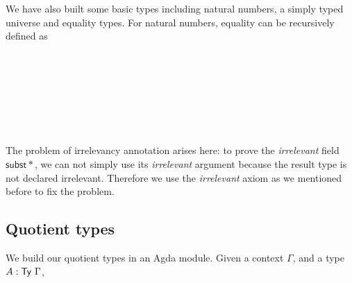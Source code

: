 We have also built some basic types including natural numbers, a simply typed universe and equality types.
For natural numbers, equality can be recursively defined as
\begin{code}
%
\\
\>[0]\<[2]%
\>[2] \AgdaSymbol{:}     \<%
\\
\>[0]\<[2]%
\>[2]   \AgdaSymbol{=} \<%
\\
\>[0]\<[2]%
\>[2]    \AgdaSymbol{=} \<%
\\
\>[0]\<[2]%
\>[2]    \AgdaSymbol{=} \<%
\\
\>[0]\<[2]%
\>[2]     \AgdaSymbol{=}   \<%
\\
\end{code}

The problem of irrelevancy annotation arises here: to prove the \emph{irrelevant} field $\mathsf{subst*}$, we can not simply use its \emph{irrelevant} argument because the result type is not declared irrelevant. Therefore we use the \emph{irrelevant} axiom as we mentioned before to fix the problem.


\begin{code}
\>[4]\AgdaSymbol{;}  \AgdaSymbol{=}  \AgdaBound{\_}    \<%
\end{code}


\subsection{Quotient types}

We build our quotient types in an Agda module.
Given a context $\Gamma$, and a type $A : \mathsf{Ty}~ \Gamma$, 

\begin{code}\>\<%
\\
\>  \AgdaSymbol{(} \AgdaSymbol{:} \AgdaSymbol{)(} \AgdaSymbol{:}  \AgdaSymbol{)}\<%
\\
\end{code}

